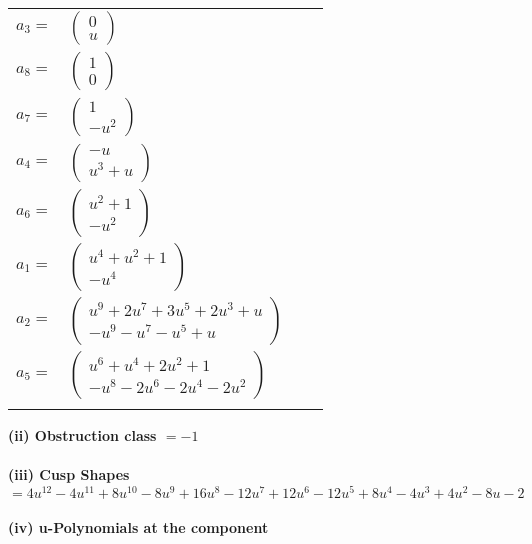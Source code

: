 \documentclass[1p]{elsarticle_modified}
\theoremstyle{definition}
\begin{document}
\begin{tabular}{m{7pt} m{180pt} m{7pt} m{180pt} }
\flushright $a_{3}=$&$\begin{pmatrix}0\\u\end{pmatrix}$ \\
\flushright $a_{8}=$&$\begin{pmatrix}1\\0\end{pmatrix}$ \\
\flushright $a_{7}=$&$\begin{pmatrix}1\\- u^2\end{pmatrix}$ \\
\flushright $a_{4}=$&$\begin{pmatrix}- u\\u^3+u\end{pmatrix}$ \\
\flushright $a_{6}=$&$\begin{pmatrix}u^2+1\\- u^2\end{pmatrix}$ \\
\flushright $a_{1}=$&$\begin{pmatrix}u^4+u^2+1\\- u^4\end{pmatrix}$ \\
\flushright $a_{2}=$&$\begin{pmatrix}u^9+2 u^7+3 u^5+2 u^3+u\\- u^9- u^7- u^5+u\end{pmatrix}$ \\
\flushright $a_{5}=$&$\begin{pmatrix}u^6+u^4+2 u^2+1\\- u^8-2 u^6-2 u^4-2 u^2\end{pmatrix}$\\&\end{tabular}
\flushleft \textbf{(ii) Obstruction class $= -1$}\\~\\
\flushleft \textbf{(iii) Cusp Shapes $= 4 u^{12}-4 u^{11}+8 u^{10}-8 u^9+16 u^8-12 u^7+12 u^6-12 u^5+8 u^4-4 u^3+4 u^2-8 u-2$}\\~\\
\newpage\renewcommand{\arraystretch}{1}
\flushleft \textbf{(iv) u-Polynomials at the component}\newline \\
\end{document}
